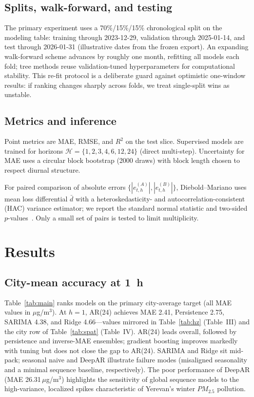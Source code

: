 \documentclass[conference]{IEEEtran}
\begin{document}
\subsection{Splits, walk-forward, and testing}
The primary experiment uses a 70\%/15\%/15\% chronological split on the modeling table: training through 2023-12-29, validation through 2025-01-14, and test through 2026-01-31 (illustrative dates from the frozen export). An expanding walk-forward scheme advances by roughly one month, refitting all models each fold; tree methods reuse validation-tuned hyperparameters for computational stability. This re-fit protocol is a deliberate guard against optimistic one-window results: if ranking changes sharply across folds, we treat single-split wins as unstable.

\subsection{Metrics and inference}
Point metrics are MAE, RMSE, and $R^2$ on the test slice. Supervised models are trained for horizons $\mathcal{H}=\{1,2,3,4,6,12,24\}$ (direct multi-step). Uncertainty for MAE uses a circular block bootstrap (2000 draws) with block length chosen to respect diurnal structure.

For paired comparison of absolute errors $\{|e_{t,h}^{(A)}|,|e_{t,h}^{(B)}|\}$, Diebold--Mariano uses mean loss differential $\bar d$ with a heteroskedasticity- and autocorrelation-consistent (HAC) variance estimator; we report the standard normal statistic and two-sided $p$-values~\cite{diebold1995comparing,harvey1997testing}. Only a small set of pairs is tested to limit multiplicity.

\section{Results}
\label{sec:results}

\subsection{City-mean accuracy at 1~h}
Table~\ref{tab:main} ranks models on the primary city-average target (all MAE values in $\mu$g/m$^3$). At $h{=}1$, AR(24) achieves MAE 2.41, Persistence 2.75, SARIMA 4.38, and Ridge 4.66---values mirrored in Table~\ref{tab:hz} (Table~III) and the city row of Table~\ref{tab:spat} (Table~IV). AR(24) leads overall, followed by persistence and inverse-MAE ensembles; gradient boosting improves markedly with tuning but does not close the gap to AR(24). SARIMA and Ridge sit mid-pack; seasonal naive and DeepAR illustrate failure modes (misaligned seasonality and a minimal sequence baseline, respectively). The poor performance of DeepAR (MAE 26.31\,$\mu$g/m$^3$) highlights the sensitivity of global sequence models to the high-variance, localized spikes characteristic of Yerevan's winter $PM_{2.5}$ pollution.
\end{document}
